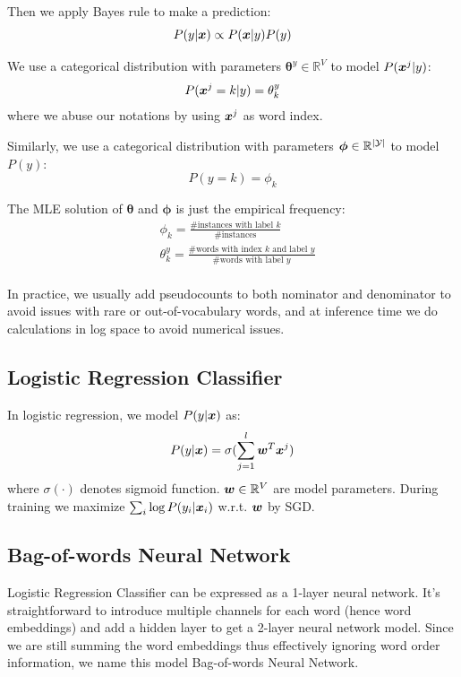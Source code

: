 \documentclass[11pt]{article}
\begin{document}
Then we apply Bayes rule to make a prediction:
\begin{equation}
    P(y | \boldsymbol{x}) \propto P(\boldsymbol{x} | y) P(y)
\end{equation}

We use a categorical distribution with parameters $\boldsymbol{\theta}^y\in \mathbb{R}^V$ to model $P(\boldsymbol{x}^j | y)$:
\begin{equation}
    P(\boldsymbol{x}^j = k | y) = {\theta}^y_k
\end{equation}
where we abuse our notations by using $\boldsymbol{x}^j$ as word index.

Similarly, we use a categorical distribution with parameters $\boldsymbol{\phi}\in \mathbb{R}^{|\mathcal{Y}|}$ to model $P(y)$:
\begin{equation}
    P(y = k) = {\phi}_k
\end{equation}

The MLE solution of $\boldsymbol{\theta}$ and $\boldsymbol{\phi}$ is just the empirical frequency:
\begin{align}
    &\phi_k = \frac{\# \text{instances with label $k$}}{\# \text{instances}}\\
    &\theta^y_k = \frac{\# \text{words with index $k$ and label $y$}}{\# \text{words with label $y$}}\\
\end{align}

In practice, we usually add pseudocounts to both nominator and denominator to avoid issues with rare or out-of-vocabulary words, and at inference time we do calculations in log space to avoid numerical issues.

\subsection{Logistic Regression Classifier}
In logistic regression, we model $P(y | \boldsymbol{x})$ as:
\begin{equation}
    P(y|\boldsymbol{x}) = \sigma (\sum_{j=1}^l \boldsymbol{w}^T \boldsymbol{x}^j)
\end{equation}
where $\sigma(\cdot)$ denotes sigmoid function. $\boldsymbol{w} \in \mathbb{R}^V$ are model parameters.
During training we maximize $\sum_{i}\log P(y_i | \boldsymbol{x}_i)$ w.r.t. $\boldsymbol{w}$ by SGD.

\subsection{Bag-of-words Neural Network}
Logistic Regression Classifier can be expressed as a 1-layer neural network. It's straightforward to introduce multiple channels for each word (hence word embeddings) and add a hidden layer to get a 2-layer neural network model.
Since we are still summing the word embeddings thus effectively ignoring word order information, we name this model Bag-of-words Neural Network.
\end{document}
